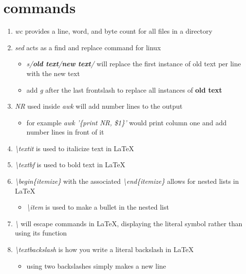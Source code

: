 \documentclass{article}
\begin{document}
\section{commands}
\begin{enumerate}
    
    \item \textit{wc} provides a line, word, and byte count for all files in a directory
    \item \textit{sed} acts as a find and replace command for linux
    \begin{itemize}
        \item \textit{s/\textbf{old text}/\textbf{new text}/} will replace the first instance of old text per line with the new text
        \item add \textit{g} after the last frontslash to replace all instances of \textbf{old text}
    \end{itemize}
    \item \textit{NR} used inside \textit{awk} will add number lines to the output
    \begin{itemize}
        \item for example \textit{awk '\{print NR, \$1\}'} would print column one and add number lines in front of it
    \end{itemize}
    \item \textit{\textbackslash textit} is used to italicize text in LaTeX
    \item \textit{\textbackslash textbf} is used to bold text in LaTeX
    \item \textit{\textbackslash begin\{itemize\}} with the associated \textit{\textbackslash end\{itemize\}} allows for nested lists in LaTeX
    \begin{itemize}
        \item \textit{\textbackslash item} is used to make a bullet in the nested list
    \end{itemize}
    \item \textit{\textbackslash} will escape commands in LaTeX, displaying the literal symbol rather than using its function
    \item \textit{\textbackslash textbackslash} is how you write a literal backslash in LaTeX
    \begin{itemize}
        \item using two backslashes simply makes a new line
    \end{itemize}
    
\end{enumerate}
\end{document}
